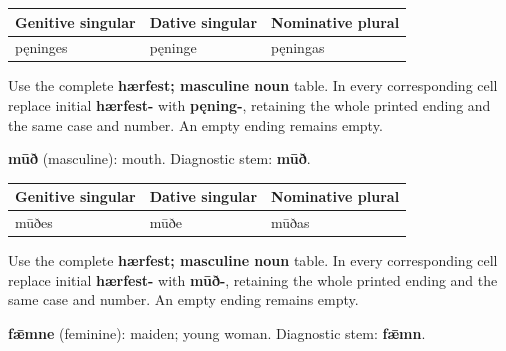 \par\begingroup
\fontsize{10.5}{13.2}\selectfont
\setlength{\LTleft}{0pt}\setlength{\LTright}{\fill}
\noindent
\begin{tabular}{@{}>{\raggedright\arraybackslash}p{39.24mm}>{\raggedright\arraybackslash}p{36.31mm}>{\raggedright\arraybackslash}p{42.82mm}@{}}
\toprule
\textbf{Genitive singular} & \textbf{Dative singular} & \textbf{Nominative plural} \\
\midrule
pęninges & pęninge & pęningas \\
\bottomrule
\end{tabular}
\par\endgroup

Use the complete \textbf{hærfest; masculine noun} table. In every corresponding cell replace initial \textbf{hærfest-} with \textbf{pęning-}, retaining the whole printed ending and the same case and number. An empty ending remains empty.

\textbf{mūð} (masculine): mouth. Diagnostic stem: \textbf{mūð}.

\par\begingroup
\fontsize{10.5}{13.2}\selectfont
\setlength{\LTleft}{0pt}\setlength{\LTright}{\fill}
\noindent
\begin{tabular}{@{}>{\raggedright\arraybackslash}p{39.24mm}>{\raggedright\arraybackslash}p{36.31mm}>{\raggedright\arraybackslash}p{42.82mm}@{}}
\toprule
\textbf{Genitive singular} & \textbf{Dative singular} & \textbf{Nominative plural} \\
\midrule
mūðes & mūðe & mūðas \\
\bottomrule
\end{tabular}
\par\endgroup

Use the complete \textbf{hærfest; masculine noun} table. In every corresponding cell replace initial \textbf{hærfest-} with \textbf{mūð-}, retaining the whole printed ending and the same case and number. An empty ending remains empty.

\textbf{fǣmne} (feminine): maiden; young woman. Diagnostic stem: \textbf{fǣmn}.

